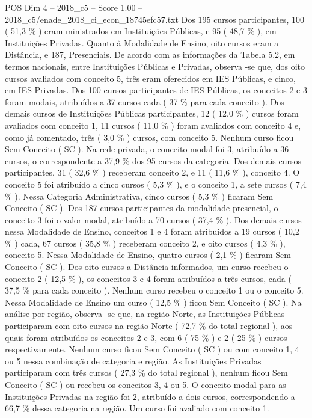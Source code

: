 \begin{textsample}{POS Dim 4 – 2018\_c5 – Score 1.00 – 2018\_c5/enade\_2018\_ci\_econ\_18745efc57.txt}
Dos 195 cursos participantes, 100 ( 51,3 \% ) eram ministrados em Instituições Públicas, e 95 ( 48,7 \% ), em Instituições Privadas.
Quanto à Modalidade de Ensino, oito cursos eram a Distância, e 187, Presenciais.
De acordo com as informações da Tabela 5.2, em termos nacionais, entre Instituições Públicas e Privadas, observa -se que, dos oito cursos avaliados com conceito 5, três eram oferecidos em IES Públicas, e cinco, em IES Privadas.
Dos 100 cursos participantes de IES Públicas, os conceitos 2 e 3 foram modais, atribuídos a 37 cursos cada ( 37 \% para cada conceito ).
Dos demais cursos de Instituições Públicas participantes, 12 ( 12,0 \% ) cursos foram avaliados com conceito 1, 11 cursos ( 11,0 \% ) foram avaliados com conceito 4 e, como já comentado, três ( 3,0 \% ) cursos, com conceito 5.
Nenhum curso ficou Sem Conceito ( SC ).
Na rede privada, o conceito modal foi 3, atribuído a 36 cursos, o correspondente a 37,9 \% dos 95 cursos da categoria.
Dos demais cursos participantes, 31 ( 32,6 \% ) receberam conceito 2, e 11 ( 11,6 \% ), conceito 4.
O conceito 5 foi atribuído a cinco cursos ( 5,3 \% ), e o conceito 1, a sete cursos ( 7,4 \% ).
Nessa Categoria Administrativa, cinco cursos ( 5,3 \% ) ficaram Sem Conceito ( SC ).
Dos 187 cursos participantes da modalidade presencial, o conceito 3 foi o valor modal, atribuído a 70 cursos ( 37,4 \% ).
Dos demais cursos nessa Modalidade de Ensino, conceitos 1 e 4 foram atribuídos a 19 cursos ( 10,2 \% ) cada, 67 cursos ( 35,8 \% ) receberam conceito 2, e oito cursos ( 4,3 \% ), conceito 5.
Nessa Modalidade de Ensino, quatro cursos ( 2,1 \% ) ficaram Sem Conceito ( SC ).
Dos oito cursos a Distância informados, um curso recebeu o conceito 2 ( 12,5 \% ), os conceitos 3 e 4 foram atribuídos a três cursos, cada ( 37,5 \% para cada conceito ).
Nenhum curso recebeu o conceito 1 ou o conceito 5.
Nessa Modalidade de Ensino um curso ( 12,5 \% ) ficou Sem Conceito ( SC ).
Na análise por região, observa -se que, na região Norte, as Instituições Públicas participaram com oito cursos na região Norte ( 72,7 \% do total regional ), aos quais foram atribuídos os conceitos 2 e 3, com 6 ( 75 \% ) e 2 ( 25 \% ) cursos respectivamente.
Nenhum curso ficou Sem Conceito ( SC ) ou com conceito 1, 4 ou 5 nessa combinação de categoria e região.
As Instituições Privadas participaram com três cursos ( 27,3 \% do total regional ), nenhum ficou Sem Conceito ( SC ) ou recebeu os conceitos 3, 4 ou 5.
O conceito modal para as Instituições Privadas na região foi 2, atribuído a dois cursos, correspondendo a 66,7 \% dessa categoria na região.
Um curso foi avaliado com conceito 1.

\end{textsample}
